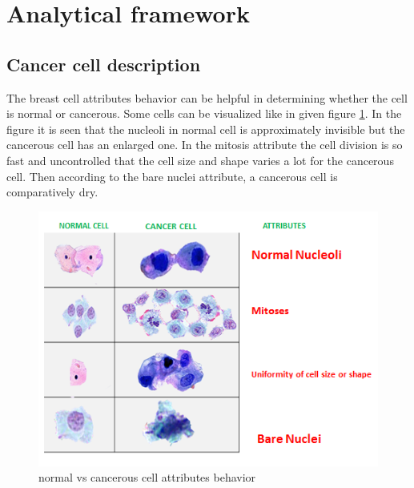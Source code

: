 \documentclass[conference]{IEEEtran}
\begin{document}
\section{Analytical framework}
\subsection{Cancer cell description}

The breast cell attributes behavior can be helpful in determining whether the cell is normal or cancerous. Some cells can be visualized like in given figure \ref{fig_attri}. In the figure it is seen that the nucleoli in normal cell is approximately invisible but the cancerous cell has an enlarged one. In the mitosis attribute the cell division is so fast and uncontrolled that the cell size and shape varies a lot for the cancerous cell. Then according to the bare nuclei attribute, a cancerous cell is comparatively dry.  

\begin{figure}[!h]
\centering
\includegraphics[scale=0.7]{attri}
\caption{normal vs cancerous cell attributes behavior}
\label{fig_attri}
\end{figure}
\end{document}
